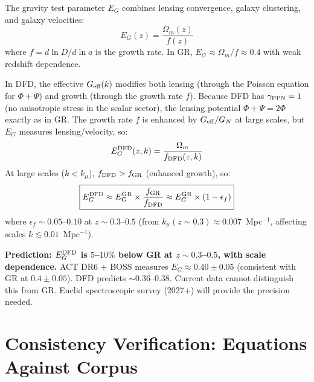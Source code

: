 \documentclass[11pt,a4paper]{article}
\newcommand{\Geff}{G_{\rm eff}}
\newcommand{\kmu}{k_\mu}
\begin{document}
The gravity test parameter $E_G$ combines lensing convergence,
galaxy clustering, and galaxy velocities:
\begin{equation}
E_G(z) = \frac{\Omega_m(z)}{f(z)}
\end{equation}
where $f = d\ln D / d\ln a$ is the growth rate.  In GR,
$E_G \approx \Omega_m / f \approx 0.4$ with weak redshift
dependence.

In DFD, the effective $\Geff(k)$ modifies both lensing
(through the Poisson equation for $\Phi + \Psi$) and
growth (through the growth rate $f$).  Because DFD has
$\gamma_{\rm PPN} = 1$ (no anisotropic stress in the
scalar sector), the lensing potential $\Phi + \Psi = 2\Phi$
exactly as in GR.  The growth rate $f$ is enhanced by
$\Geff / G_N$ at large scales, but $E_G$ measures
lensing/velocity, so:
\begin{equation}
E_G^{\rm DFD}(z, k) = \frac{\Omega_m}{f_{\rm DFD}(z, k)}
\end{equation}
At large scales ($k < \kmu$), $f_{\rm DFD} > f_{\rm GR}$
(enhanced growth), so:
\begin{equation}
\boxed{
E_G^{\rm DFD} \approx E_G^{\rm GR} \times
\frac{f_{\rm GR}}{f_{\rm DFD}}
\approx E_G^{\rm GR} \times (1 - \epsilon_f)
}
\end{equation}
where $\epsilon_f \sim 0.05$--$0.10$ at $z \sim 0.3$--$0.5$
(from $\kmu(z \sim 0.3) \approx 0.007$~Mpc$^{-1}$, affecting
scales $k \lesssim 0.01$~Mpc$^{-1}$).

\textbf{Prediction: $E_G^{\rm DFD}$ is $5$--$10\%$ below
GR at $z \sim 0.3$--$0.5$, with scale dependence.}
ACT DR6 + BOSS measures $E_G \approx 0.40 \pm 0.05$
(consistent with GR at $0.4 \pm 0.05$).  DFD predicts
$\sim 0.36$--$0.38$.  Current data cannot distinguish
this from GR.  Euclid spectroscopic survey (2027+) will
provide the precision needed.


\section{Consistency Verification: Equations Against Corpus}
\end{document}
